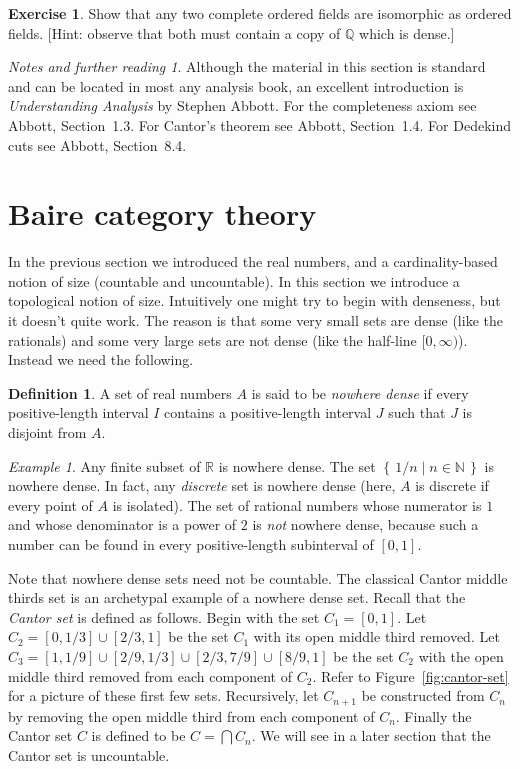 \documentclass[11pt,oneside]{amsbook}
\newcommand{\set}[1]{\left\{\,#1\,\right\}}
\newcommand{\N}{\mathbb N}
\newcommand{\Q}{\mathbb Q}
\newcommand{\R}{\mathbb R}
\theoremstyle{definition}
\newtheorem{exerc}{Exercise}[section]
\theoremstyle{plain}
\theoremstyle{definition}
\newtheorem{definition}[theorem]{Definition}
\theoremstyle{remark}
\newtheorem{example}[theorem]{Example}
\newtheorem*{notes}{Notes and further reading}
\numberwithin{equation}{section}
\numberwithin{figure}{section}
\begin{document}
\begin{exerc}
  Show that any two complete ordered fields are isomorphic as ordered fields. [Hint: observe that both must contain a copy of $\Q$ which is dense.]
\end{exerc}

\begin{notes}
  Although the material in this section is standard and can be located in most any analysis book, an excellent introduction is \emph{Understanding Analysis} by Stephen Abbott. For the completeness axiom see Abbott, Section~1.3. For Cantor's theorem see Abbott, Section~1.4. For Dedekind cuts see Abbott, Section~8.4.
\end{notes}

\newpage
\section{Baire category theory}

In the previous section we introduced the real numbers, and a cardinality-based notion of size (countable and uncountable). In this section we introduce a topological notion of size. Intuitively one might try to begin with denseness, but it doesn't quite work. The reason is that some very small sets are dense (like the rationals) and some very large sets are not dense (like the half-line $[0,\infty)$). Instead we need the following.

\begin{definition}
  A set of real numbers $A$ is said to be \emph{nowhere dense} if every positive-length interval $I$ contains a positive-length interval $J$ such that $J$ is disjoint from $A$.
\end{definition}

\begin{example}
  Any finite subset of $\R$ is nowhere dense. The set $\set{1/n\mid n\in\N}$ is nowhere dense. In fact, any \emph{discrete} set is nowhere dense (here, $A$ is discrete if every point of $A$ is isolated). The set of rational numbers whose numerator is $1$ and whose denominator is a power of $2$ is \emph{not} nowhere dense, because such a number can be found in every positive-length subinterval of $[0,1]$.
\end{example}

Note that nowhere dense sets need not be countable. The classical Cantor middle thirds set is an archetypal example of a nowhere dense set. Recall that the \emph{Cantor set} is defined as follows. Begin with the set $C_1=[0,1]$. Let $C_2=[0,1/3]\cup[2/3,1]$ be the set $C_1$ with its open middle third removed. Let $C_3=[1,1/9]\cup[2/9,1/3]\cup[2/3,7/9]\cup[8/9,1]$ be the set $C_2$ with the open middle third removed from each component of $C_2$. Refer to Figure~\ref{fig:cantor-set} for a picture of these first few sets. Recursively, let $C_{n+1}$ be constructed from $C_n$ by removing the open middle third from each component of $C_n$. Finally the Cantor set $C$ is defined to be $C=\bigcap C_n$. We will see in a later section that the Cantor set is uncountable. %
\end{document}
